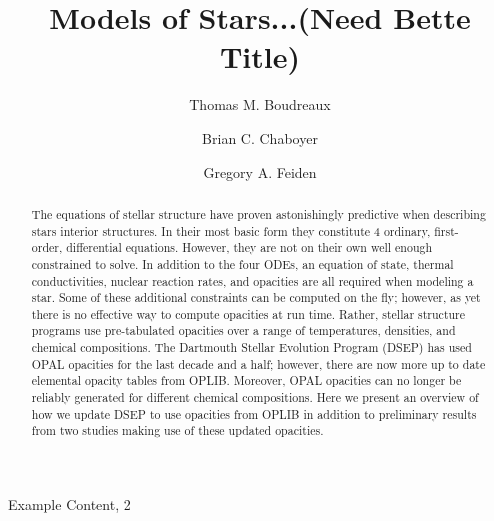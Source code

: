\documentclass[twocolumn]{aastex62}
\begin{document}
\title{Models of Stars...(Need Bette Title)}

\author[0000-0002-2600-7513]{Thomas M. Boudreaux}

\author[0000-0003-3096-4161]{Brian C. Chaboyer}

\author[0000-0002-2012-7215]{Gregory A. Feiden}



\begin{abstract}
	The equations of stellar structure have proven astonishingly predictive
	when describing stars interior structures.  In their most basic form they
	constitute 4 ordinary, first-order, differential equations. However, they
	are not on their own well enough constrained to solve. In addition to the
	four ODEs, an equation of state, thermal conductivities, nuclear reaction
	rates, and opacities are all required when modeling a star. Some of these
	additional constraints can be computed on the fly; however, as yet there is
	no effective way to compute opacities at run time. Rather, stellar
	structure programs use pre-tabulated opacities over a range of
	temperatures, densities, and chemical compositions. The Dartmouth Stellar
	Evolution Program (DSEP) has used OPAL opacities for the last decade and a
	half; however, there are now more up to date elemental opacity tables from
	OPLIB. Moreover, OPAL opacities can no longer be reliably generated for
	different chemical compositions.  Here we present an overview of how we
	update DSEP to use opacities from OPLIB in addition to preliminary results
	from two studies making use of these updated opacities.
	\vspace{1cm}
\end{abstract}


\keywords{}

Example Content, 2




\acknowledgments

% 
\end{document}
